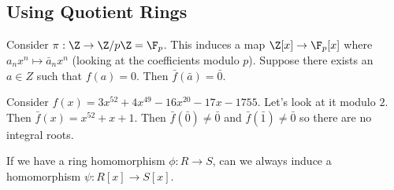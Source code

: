 \subsection{Using Quotient Rings}

Consider $\pi : \Z \to \Z/p\Z = \F_p$. This induces a map $\Z[x] \to \F_p[x]$ where $a_nx^n \mapsto \bar{a}_nx^n$ (looking at the coefficients modulo $p$). Suppose there exists an $a \in Z$ such that $f(a) = 0$. Then $\bar{f}(\bar{a}) = \bar{0}$.

\begin{example}
Consider $f(x) = 3x^{52} + 4x^{49} - 16x^{20} - 17x - 1755$. Let's look at it modulo $2$. Then $\bar{f}(x) = x^{52} + x + 1$. Then $\bar{f}(\bar{0}) \not= \bar{0}$ and $\bar{f}(\bar{1}) \not= \bar{0}$ so there are no integral roots.
\end{example}

\begin{problem}
If we have a ring homomorphism $\phi : R \to S$, can we always induce a homomorphism $\psi : R[x] \to S[x]$.
\end{problem}